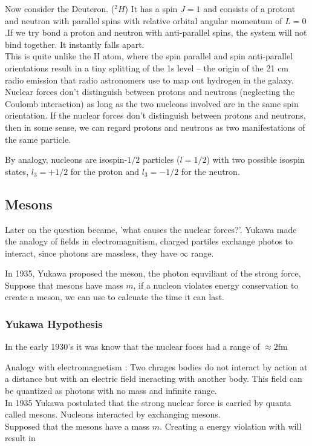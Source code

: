 \documentclass[english, 11pt]{article}
\begin{document}
      Now consider the Deuteron. ($^2H$) It has a spin $J=1$ and consists of a protont and neutron with parallel spins with relative orbital angular momentum of $L=0$.If we try bond a proton and neutron with anti-parallel spins, the system will not bind together. It instantly falls apart.\\
      This is quite unlike the H atom, where the spin parallel and spin anti-parallel orientations result in a tiny splitting of the 1s level -- the origin of the 21 cm radio emission that radio astronomers use to map out hydrogen in the galaxy.\\
      Nuclear forces don't distinguish between protons and neutrons (neglecting the Coulomb interaction) as long as the two nucleons involved are in the same spin orientation. If the nuclear forces don't distinguish between protons and neutrons, then in some sense, we can regard protons and neutrons as two manifestations of the same particle.

      \begin{defn}\label{isospin}
        By analogy, nucleons are isospin-$1/2$ particles ($l=1/2$) with two possible isospin states, $l_3=+1/2$ for the proton and $l_3 = -1/2$ for the neutron.
      \end{defn}

      \subsection{Mesons}

      Later on the question became, 'what causes the nuclear forces?'. Yukawa made the analogy of fields in electromagnitism, charged partiles exchange photos to interact, since photons are massless, they have $\infty$ range. 

      In 1935, Yukawa proposed the meson, the photon equviliant of the strong force, Suppose that mesons have mass $m$, if a nucleon violates energy conservation to create a meson, we can use  to calcuate the time it can last.

      \subsubsection{Yukawa Hypothesis}
      In the early 1930's it was know that the nuclear foces had a range of $\approx 2\text{fm}$ 

      Analogy with electromagnetism : Two chrages bodies do not interact by action at a distance but with an electric field ineracting with another body. This field can be quantized as photons with no mass and infinite range.\\
      In 1935 Yukawa postulated that the strong nuclear force is carried by quanta called mesons. Nucleons interacted by exchanging mesons.\\
      Supposed that the mesons have a mass $m$. Creating a energy violation with  will result in 
\end{document}
